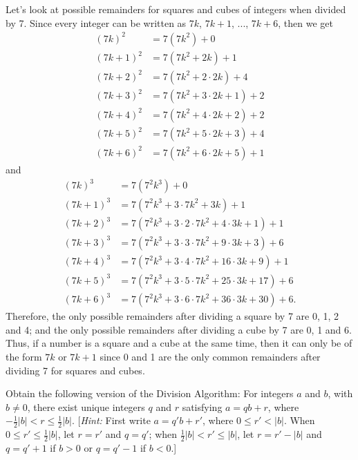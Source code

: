 \begin{solution}
    Let's look at possible remainders for squares and cubes of integers when divided by 7. Since every integer can be written as $7k$, $7k + 1$, ..., $7k+6$, then we get
    \begin{align*}
        (7k)^2 &= 7(7k^2) + 0 \\
        (7k + 1)^2 &= 7(7k^2 + 2k) + 1 \\
        (7k+2)^2 &= 7(7k^2 + 2\cdot 2k) + 4 \\
        (7k+3)^2 &= 7(7k^2 + 3\cdot 2k + 1) + 2 \\
        (7k+4)^2 &= 7(7k^2 + 4\cdot 2k + 2) + 2 \\
        (7k+5)^2 &= 7(7k^2 + 5\cdot 2k + 3) + 4 \\
        (7k+6)^2 &= 7(7k^2 + 6\cdot 2k + 5) + 1 
    \end{align*}
    and 
    \begin{align*}
        (7k)^3 &= 7(7^2k^3) + 0\\
        (7k+1)^3 &= 7(7^2k^3 + 3 \cdot 7k^2 + 3k) + 1\\
        (7k+2)^3 &= 7(7^2k^3 + 3 \cdot 2 \cdot 7k^2 + 4 \cdot 3k + 1) + 1\\
        (7k+3)^3 &= 7(7^2k^3 + 3 \cdot 3 \cdot 7k^2 + 9 \cdot 3k + 3) + 6\\
        (7k+4)^3 &= 7(7^2k^3 + 3 \cdot 4 \cdot 7k^2 + 16 \cdot 3k + 9) + 1\\
        (7k+5)^3 &= 7(7^2k^3 + 3 \cdot 5 \cdot 7k^2 + 25 \cdot 3k + 17) + 6\\
        (7k+6)^3 &= 7(7^2k^3 + 3 \cdot 6 \cdot 7k^2 + 36 \cdot 3k + 30) + 6.
    \end{align*}
    Therefore, the only possible remainders after dividing a square by 7 are 0, 1, 2 and 4; and the only possible remainders after dividing a cube by 7 are 0, 1 and 6. Thus, if a number is a square and a cube at the same time, then it can only be of the form $7k$ or $7k+1$ since 0 and 1 are the only common remainders after dividing 7 for squares and cubes. \\
\end{solution}

\begin{exercise}
    Obtain the following version of the Division Algorithm: For integers $a$ and $b$, with $b \neq 0$, there exist unique integers $q$ and $r$ satisfying $a = qb + r$, where $-\frac{1}{2}|b| < r \leq \frac{1}{2}|b|$. [\textit{Hint:} First write $a = q'b + r'$, where $0 \leq r' < |b|$. When $0 \leq r' \leq \frac{1}{2}|b|$, let $r = r'$ and $q = q'$; when $\frac{1}{2}|b| < r' \leq |b|$, let $r = r' - |b|$ and $q = q' + 1$ if $b > 0$ or $q = q' - 1$ if $b < 0$.]\\
\end{exercise}

